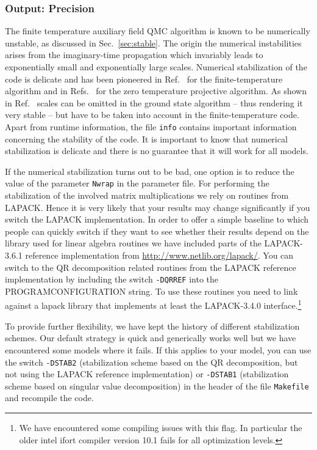 \documentclass{SciPost}
\begin{document}
\subsubsection{Output: Precision} \label{sec:output_prec}
%
The finite temperature  auxiliary field QMC algorithm is known to be numerically  unstable, as discussed in Sec.~\ref{sec:stable}.
The origin the numerical instabilities arises  from the imaginary-time propagation which invariably leads to exponentially small and exponentially large scales.
Numerical stabilization of the code is delicate and has been pioneered in Ref.~\cite{White89}  for the finite-temperature algorithm and in Refs.~\cite{Sugiyama86,Sorella89} for the zero temperature projective algorithm.
As shown in Ref.~\cite{Assaad08_rev}  scales can be omitted in the ground state algorithm -- thus rendering it very stable --  but have to be taken into account in the  finite-temperature code. Apart from runtime information, the file \texttt{info} contains important information concerning the stability of the code.
It is important to know that numerical stabilization is delicate and there is no guarantee  that it will work for all models.


If the numerical stabilization turns out to be bad, one option is to reduce the  value of the parameter \texttt{Nwrap} in the parameter file. 
For performing the stabilization of the involved matrix multiplications we rely on routines from LAPACK. Hence it is very likely that your results may change significantly if you switch the LAPACK implementation.
In order to offer a simple baseline to which people can quickly switch if they want to see whether their results depend on the library used for linear algebra routines we have included parts of the LAPACK-3.6.1 reference implementation from
\url{http://www.netlib.org/lapack/}. You can switch to the QR decomposition related routines from the LAPACK reference implementation by including the switch \texttt{-DQRREF} into the PROGRAMCONFIGURATION string.
To use these routines you need to link against a lapack library that implements at least the LAPACK-3.4.0 interface.\footnote{ We have encountered some compiling issues with this flag. In particular  the  older  intel  ifort  compiler version 10.1  fails for all optimization levels.}

To provide further flexibility, we have  kept the history of different stabilization schemes.   Our default strategy is quick and generically works well but we have  encountered some  models where  it  fails.   If this applies to your model, you can use the switch 
\texttt{-DSTAB2} (stabilization scheme based on the QR decomposition, but not using the LAPACK reference implementation) or  
\texttt{-DSTAB1} (stabilization scheme based on singular value decomposition)   in the header of the file \texttt{Makefile} and recompile the code.  
\end{document}
